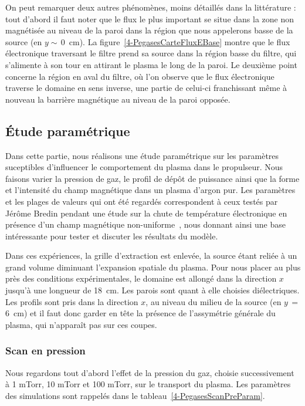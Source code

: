 \begin{refsection}
On peut remarquer
deux autres phénomènes, moins détaillés dans la littérature : tout d'abord il
faut noter que le flux le plus important se situe dans la zone non magnétisée au
niveau de la paroi dans la région que nous appelerons basse de la source (en
$y\sim\,$0~cm).
La figure~\ref{4-PegasesCarteFluxEBase} montre que le flux électronique
traversant le filtre prend sa source dans la région basse du filtre, qui
s'alimente à son tour en attirant le plasma le long de la paroi.
Le deuxième point concerne la région en aval du filtre, où l'on observe que le
flux électronique traverse le domaine en sens inverse, une partie de celui-ci franchissant même à nouveau
la barrière magnétique au niveau de la paroi opposée.

\subsection{Étude paramétrique}
Dans cette partie, nous
réalisons une étude paramétrique sur les paramètres suceptibles
d'influencer le comportement du plasma dans le propulseur. Nous faisons varier
la pression de gaz, le profil de dépôt de puissance ainsi que la forme et
l'intensité du champ magnétique dans un plasma d'argon pur. Les paramètres et
les plages de valeurs qui ont été regardés correspondent à ceux testés par Jérôme Bredin pendant une étude sur la
chute de température électronique en présence d'un champ magnétique
non-uniforme~\parencite{Bredin}, nous donnant ainsi une base intéressante pour
tester et discuter les résultats du modèle.

Dans ces expériences, la grille d'extraction est
enlevée, la source étant reliée à un grand volume diminuant l'expansion spatiale du plasma. Pour nous
placer au plus près des conditions expérimentales, le domaine est allongé dans
la direction $x$ jusqu'à une longueur de 18~cm. Les parois sont quant à elle
choisies diélectriques. Les profils sont pris dans la direction $x$, au niveau
du milieu de la source (en $y\,=$ 6~cm) et il faut donc garder en tête la
présence de l'assymétrie générale du plasma, qui n'apparaît pas sur ces coupes.
	
\subsubsection{Scan en pression}

Nous regardons tout d'abord l'effet de la pression du gaz, choisie
successivement à 1 mTorr, 10 mTorr et 100 mTorr, sur le transport du plasma.
Les paramètres des simulations sont rappelés dans le
	tableau~\ref{4-PegasesScanPreParam}.
	

\end{refsection}
